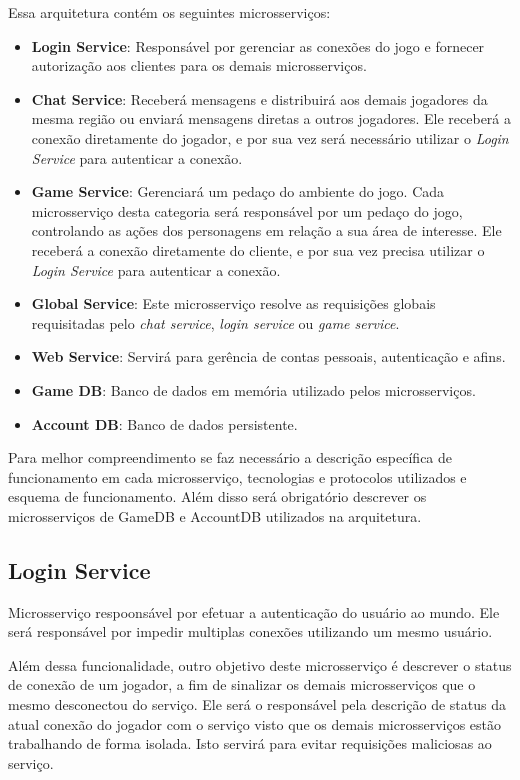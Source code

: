 Essa arquitetura contém os seguintes microsserviços:

\begin{itemize}
  \item \textbf{Login Service}: Responsável por gerenciar as conexões do jogo e fornecer autorização aos clientes para os demais microsserviços.
  \item \textbf{Chat Service}: Receberá mensagens e distribuirá aos demais jogadores da mesma região ou enviará mensagens diretas a outros jogadores. Ele receberá a conexão diretamente do jogador, e por sua vez será necessário utilizar o \textit{Login Service} para autenticar a conexão.
  \item \textbf{Game Service}: Gerenciará um pedaço do ambiente do jogo. Cada microsserviço desta categoria será responsável por um pedaço do jogo, controlando as ações dos personagens em relação a sua área de interesse. Ele receberá a conexão diretamente do cliente, e por sua vez precisa utilizar o \textit{Login Service} para autenticar a conexão.
  \item \textbf{Global Service}: Este microsserviço resolve as requisições globais requisitadas pelo \textit{chat service}, \textit{login service} ou \textit{game service}.
  \item \textbf{Web Service}: Servirá para gerência de contas pessoais, autenticação e afins.
  \item \textbf{Game DB}: Banco de dados em memória utilizado pelos microsserviços.
  \item \textbf{Account DB}: Banco de dados persistente.
\end{itemize}


Para melhor compreendimento se faz necessário a descrição específica de funcionamento em cada microsserviço, tecnologias e protocolos utilizados e esquema de funcionamento.
%
Além disso será obrigatório descrever os microsserviços de GameDB e AccountDB utilizados na arquitetura.

\subsection{Login Service}

Microsserviço respoonsável por efetuar a autenticação do usuário ao mundo.
%
Ele será responsável por impedir multiplas conexões utilizando um mesmo usuário.



Além dessa funcionalidade, outro objetivo deste microsserviço é descrever o status de conexão de um jogador, a fim de sinalizar os demais microsserviços que o mesmo desconectou do serviço.
%
Ele será o responsável pela descrição de status da atual conexão do jogador com o serviço visto que os demais microsserviços estão trabalhando de forma isolada.
%
Isto servirá para evitar requisições maliciosas ao serviço.



